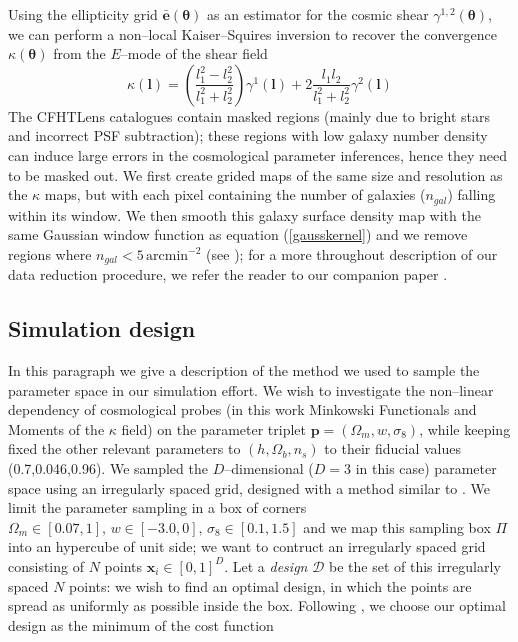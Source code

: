 \documentclass[reprint,aps,prd,superscriptaddress,showkeys]{revtex4-1}
\begin{document}
%
Using the ellipticity grid $\bar{\mathbf{e}}(\pmb{\theta})$ as an estimator for the cosmic shear $\gamma^{1,2}(\pmb{\theta})$, we can perform a non--local Kaiser--Squires inversion to recover the convergence $\kappa(\pmb{\theta})$ from the $E$--mode of the shear field
%
\begin{equation}
\kappa(\mathbf{l}) = \left(\frac{l_1^2-l_2^2}{l_1^2+l_2^2}\right)\gamma^1(\mathbf{l}) + 2\frac{l_1l_2}{l_1^2+l_2^2}\gamma^2(\mathbf{l})
\end{equation}
%
The CFHTLens catalogues contain masked regions (mainly due to bright stars and incorrect PSF subtraction); these regions with low galaxy number density can induce large errors in the cosmological parameter inferences, hence they need to be masked out. We first create grided maps of the same size and resolution as the $\kappa$ maps, but with each pixel containing the number of galaxies ($n_{gal}$) falling within its window. We then smooth this galaxy surface density map with the same Gaussian window function as equation (\ref{gausskernel}) and we remove regions where $n_{gal} < 5 \,\mathrm{arcmin}^{−2}$ (see \citep{CFHTMasato}); for a more throughout description of our data reduction procedure, we refer the reader to our companion paper \citep{Companion}. 

\subsection{Simulation design}
In this paragraph we give a description of the method we used to sample the parameter space in our simulation effort. We wish to investigate the non--linear dependency of cosmological probes (in this work Minkowski Functionals and Moments of the $\kappa$ field) on the parameter triplet $\mathbf{p}=(\Omega_m,w,\sigma_8)$, while keeping fixed the other relevant parameters to $(h,\Omega_b,n_s)$ to their fiducial values (0.7,0.046,0.96). We sampled the $D$--dimensional ($D=3$ in this case) parameter space using an irregularly spaced grid, designed with a method similar to \citep{coyote2}. We limit the parameter sampling in a box of corners $\Omega_m\in[0.07,1],\,w\in[-3.0,0],\,\sigma_8\in[0.1,1.5]$ and we map this sampling box $\Pi$ into an hypercube of unit side; we want to contruct an irregularly spaced grid consisting of $N$ points $\mathbf{x}_i\in[0,1]^D$. Let a \textit{design} $\mathcal{D}$ be the set of this irregularly spaced $N$ points: we wish to find an optimal design, in which the points are spread as uniformly as possible inside the box. Following \citep{coyote2}, we choose our optimal design as the minimum of the cost function
\end{document}
